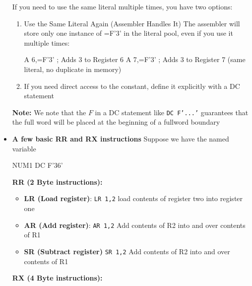 \documentclass{report}
\begin{document}
\begin{itemize}
                    \bigbreak \noindent 
                    If you need to use the same literal multiple times, you have two options:
                    \begin{enumerate}
                        \item Use the Same Literal Again (Assembler Handles It) The assembler will store only one instance of =F'3' in the literal pool, even if you use it multiple times:
                            \bigbreak \noindent 
                            \begin{cppcode}
                                A 6,=F'3'   ; Adds 3 to Register 6
                                A 7,=F'3'   ; Adds 3 to Register 7 (same literal, no duplicate in memory)
                            \end{cppcode}
                            \bigbreak \noindent 
                        \item If you need direct access to the constant, define it explicitly with a DC statement
                    \end{enumerate}
                    \bigbreak \noindent 
                    \textbf{Note:} We note that the $F$ in a DC statement like \texttt{DC F'...'} guarantees that the full word will be placed at the beginning of a fullword boundary
                \item \textbf{A few basic RR and RX instructions}
                    \bigbreak \noindent 
                    Suppose we have the named variable
                    \bigbreak \noindent 
                    \begin{cppcode}
                    NUM1    DC F'36'
                    \end{cppcode}
                    \bigbreak \noindent 
                    \textbf{RR (2 Byte instructions):}
                    \begin{itemize}
                        \item \textbf{LR (Load register)}: \texttt{LR 1,2} load contents of register two into register one
                        \item \textbf{AR (Add register)}: \texttt{AR 1,2} Add contents of R2 into and over contents of R1
                        \item \textbf{SR (Subtract register)} \texttt{SR 1,2} Add contents of R2 into and over contents of R1
                    \end{itemize}
                    \bigbreak \noindent 
                    \textbf{RX (4 Byte instructions):}
                    \begin{itemize}

\end{itemize}
\end{itemize}
\end{document}
